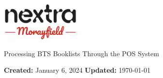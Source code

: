 \documentclass[a4paper, 12pt]{article}
\let\Huge\headingfont
\begin{document}
\begin{titlepage}
	\begin{minipage}[t]{1\columnwidth}
		\begin{flushright}
       	\vspace{-0.6in}
       	\includegraphics[width=0.3\textwidth]{MonextraNew.png}
			\vspace{0.5in}
		\par\end{flushright}
	\end{minipage}

	\begin{center}
		{\Huge Processing BTS Booklists Through the POS System}
	\end{center}
	\vspace{2em}
	\noindent
	\textbf{Created:} January 6, 2024
	\hfill
	\textbf{Updated:} \today
	\\\\\indent
	
	\tableofcontents
\end{titlepage}

\newpage
\end{document}
